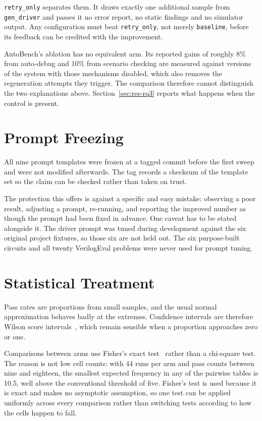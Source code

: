 \documentclass[11pt,a4paper,titlepage=false]{scrreprt}
\begin{document}
\texttt{retry\_only} separates them. It draws exactly one additional sample from
\texttt{gen\_driver} and passes it no error report, no static findings and no simulator
output. Any configuration must beat \texttt{retry\_only}, not merely \texttt{baseline},
before its feedback can be credited with the improvement.

AutoBench's ablation has no equivalent arm. Its reported gains of roughly 8\% from
auto-debug and 10\% from scenario checking are measured against versions of the system with
those mechanisms disabled, which also removes the regeneration attempts they trigger. The
comparison therefore cannot distinguish the two explanations above.
Section~\ref{sec:res-rq3} reports what happens when the control is present.

\section{Prompt Freezing}\label{sec:exp-freeze}

All nine prompt templates were frozen at a tagged commit before the first sweep and were not
modified afterwards. The tag records a checksum of the template set so the claim can be
checked rather than taken on trust.

The protection this offers is against a specific and easy mistake: observing a poor result,
adjusting a prompt, re-running, and reporting the improved number as though the prompt had
been fixed in advance. One caveat has to be stated alongside it. The driver prompt was tuned
during development against the six original project fixtures, so those six are not held out.
The six purpose-built circuits and all twenty VerilogEval problems were never used for
prompt tuning.

\section{Statistical Treatment}\label{sec:exp-stats}

Pass rates are proportions from small samples, and the usual normal approximation behaves
badly at the extremes. Confidence intervals are therefore Wilson score
intervals~\cite{wilson1927}, which remain sensible when a proportion approaches zero or one.

Comparisons between arms use Fisher's exact test~\cite{fisher1922} rather than a chi-square
test. The reason is not low cell counts: with 44 runs per arm and pass counts between nine
and eighteen, the smallest expected frequency in any of the pairwise tables is 10.5, well
above the conventional threshold of five. Fisher's test is used because it is exact and
makes no asymptotic assumption, so one test can be applied uniformly across every comparison
rather than switching tests according to how the cells happen to fall.
\end{document}
